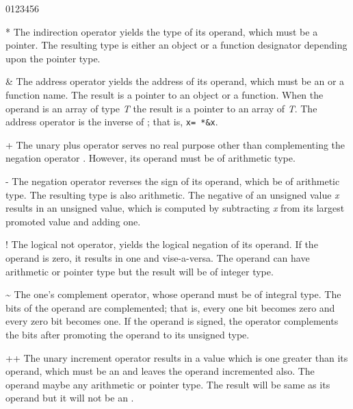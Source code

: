 \begin{production}
\begin{Ventry3}{0123456}
\item[*]        The indirection operator yields the type of its operand, which
        must be a pointer. The resulting type is either an object or a
        function designator depending upon the pointer type.

\item[\&]       The address operator yields  the address of its operand, which
        must be an  or a function name. The result is a
        pointer to an object or a function. When the operand is an
        array of type {\it T} the result is a pointer to an array of
        {\it T}. The address operator is the inverse of \T{*}; that is,
         \verb+x= *&x+.

\item[+] The unary plus operator serves no real purpose other than
        complementing the negation operator \T{-}. However, its
        operand must be of arithmetic type.
        
\item[-]        The negation operator reverses the sign of its operand,
        which be of arithmetic type. The resulting type is also
        arithmetic. The negative of an unsigned value {\it x} results
        in an unsigned value, which is computed by subtracting {\it x} from
        its largest promoted value and adding one. 

\item[!]        The logical not operator, yields the logical negation of
        its operand. If the operand is zero, it results in one and
        vise-a-versa. The operand can have arithmetic or pointer type
        but the result will be of integer type.

\item[\~{}]     The one's complement operator, 
        whose operand must be of integral type. The bits of the
        operand are complemented; that is, every one bit becomes zero
        and every zero bit becomes one. If the operand is signed, the
        operator complements the bits after promoting the operand to
        its unsigned type.

\item[++]       The unary increment operator results in a value
        which is one greater than its operand, which must be an
         and leaves the operand incremented also. The
        operand maybe any arithmetic or pointer type. The result will
        be same as its operand but it will not be an .


\end{Ventry3}
\end{production}

